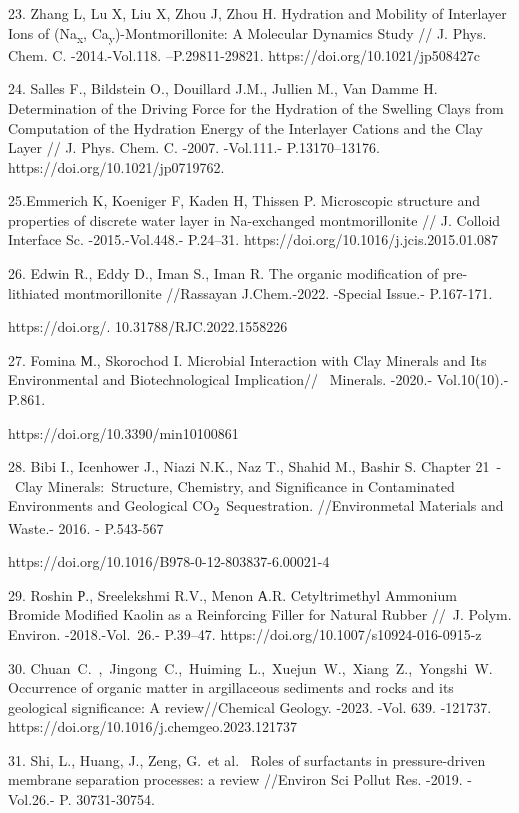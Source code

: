23. Zhang L, Lu X, Liu X, Zhou J, Zhou H. Hydration and Mobility of
Interlayer Ions of (Na\textsubscript{x},
Ca\textsubscript{y})-Montmorillonite: A Molecular Dynamics Study // J.
Phys. Chem. C. -2014.-Vol.118. --P.29811-29821.
https://doi.org/10.1021/jp508427c

24. Salles F., Bildstein O., Douillard J.M., Jullien M., Van Damme H.
Determination of the Driving Force for the Hydration of the Swelling
Clays from Computation of the Hydration Energy of the Interlayer Cations
and the Clay Layer // J. Phys. Chem. C. -2007. -Vol.111.-
P.13170--13176. https://doi.org/10.1021/jp0719762.

25.Emmerich K, Koeniger F, Kaden H, Thissen P. Microscopic structure and
properties of discrete water layer in Na-exchanged montmorillonite // J.
Colloid Interface Sc. -2015.-Vol.448.- P.24--31.
https://doi.org/10.1016/j.jcis.2015.01.087

26. Edwin R., Eddy D., Iman S., Iman R. The organic modification of
pre-lithiated montmorillonite //Rassayan J.Chem.-2022. -Special Issue.-
P.167-171.

https://doi.org/. 10.31788/RJC.2022.1558226

27. Fomina М., Skorochod I. Microbial Interaction with Clay Minerals and
Its Environmental and Biotechnological Implication//~ Minerals. -2020.-
Vol.10(10).- P.861.

https://doi.org/10.3390/min10100861

28. Bibi I., Icenhower J., Niazi N.K., Naz T., Shahid M., Bashir S.
Chapter 21~-~Clay Minerals:~Structure, Chemistry, and Significance in
Contaminated Environments and Geological
CO\textsubscript{2}~Sequestration. //Environmetal Materials and Waste.-
2016. - P.543-567

https://doi.org/10.1016/B978-0-12-803837-6.00021-4

29. Roshin Р., Sreelekshmi R.V., Menon А.R. Cetyltrimethyl Ammonium
Bromide Modified Kaolin as a Reinforcing Filler for Natural Rubber //~J.
Polym. Environ. -2018.-Vol.~26.- P.39--47.
https://doi.org/10.1007/s10924-016-0915-z

30. Chuan~C.~,~Jingong~C.,~Huiming~L.,~Xuejun~W.,~Xiang~Z.,~Yongshi~W.
Occurrence of organic matter in argillaceous sediments and rocks and its
geological significance: A review//Chemical Geology. -2023. -Vol. 639.
-121737. https://doi.org/10.1016/j.chemgeo.2023.121737

31. Shi, L., Huang, J., Zeng, G.~et al.~ Roles of surfactants in
pressure-driven membrane separation processes: a review //Environ Sci
Pollut Res. -2019. -Vol.26.- P. 30731-30754.

